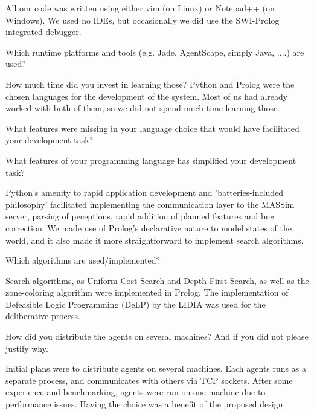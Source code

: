 All our code was written using either vim (on Linux) or Notepad++ (on Windows). We used no IDEs, but
occasionally we did use the SWI-Prolog integrated debugger.

\begin{question}
Which runtime platforms and tools (e.g. Jade, AgentScape, simply Java,
....) are used? 
\end{question}

How much time did you invest in learning those?  Python and
Prolog were the chosen languages for the development of the system. Most of us
had already worked with both of them, so we did not spend much time learning
those.

\begin{question}
What features were missing in your language choice that would have
facilitated your development task?
\end{question}



\begin{question}
What features of your programming language has simplified your development
task?  
\end{question}

Python's amenity to rapid application development and
'batteries-included philosophy' facilitated implementing the communication
layer to the MASSim server, parsing of peceptions, rapid addition of planned
features and bug correction.  We made use of Prolog's declarative nature to
model states of the world, and it also made it more straightforward to
implement search algorithms.

\begin{question}
Which algorithms are used/implemented?  
\end{question}

Search algorithms, as Uniform Cost
Search and Depth First Search, as well as the zone-coloring algorithm were
implemented in Prolog.  The implementation of Defeasible Logic Programming
(DeLP) by the LIDIA was used for the deliberative process.

\begin{question}
How did you distribute the agents on several machines? And if you did not
please justify why.  
\end{question}

Initial plans were to distribute agents on several
machines. Each agents runs as a separate process, and communicates with others
via TCP sockets. After some experience and benchmarking, agents were run on one
machine due to performance issues. Having the choice was a benefit of the
proposed design.

